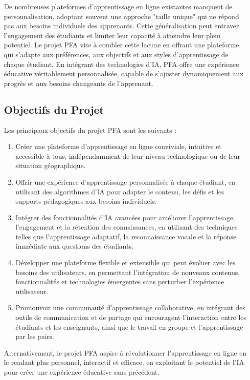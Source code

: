 De nombreuses plateformes d'apprentissage en ligne existantes manquent de personnalisation, adoptant souvent une approche "taille unique" qui ne répond pas aux besoins individuels des apprenants. Cette généralisation peut entraver l'engagement des étudiants et limiter leur capacité à atteindre leur plein potentiel. Le projet \gls{PFA} vise à combler cette lacune en offrant une plateforme qui s'adapte aux préférences, aux objectifs et aux styles d'apprentissage de chaque étudiant. En intégrant des technologies d'\gls{IA}, \gls{PFA} offre une expérience éducative véritablement personnalisée, capable de s'ajuster dynamiquement aux progrès et aux besoins changeants de l'apprenant.
\newline

\subsection*{Objectifs du Projet}

Les principaux objectifs du projet \gls{PFA} sont les suivants :

\begin{enumerate}[label=\Roman*.]

    \item Créer une plateforme d'apprentissage en ligne conviviale, intuitive et accessible à tous, indépendamment de leur niveau technologique ou de leur situation géographique.
    \item Offrir une expérience d'apprentissage personnalisée à chaque étudiant, en utilisant des algorithmes d'\gls{IA} pour adapter le contenu, les défis et les supports pédagogiques aux besoins individuels.
    \item Intégrer des fonctionnalités d'\gls{IA} avancées pour améliorer l'apprentissage, l'engagement et la rétention des connaissances, en utilisant des techniques telles que l'apprentissage adaptatif, la reconnaissance vocale et la réponse immédiate aux questions des étudiants.
    \item Développer une plateforme flexible et extensible qui peut évoluer avec les besoins des utilisateurs, en permettant l'intégration de nouveaux contenus, fonctionnalités et technologies émergentes sans perturber l'expérience utilisateur.
    \item Promouvoir une communauté d'apprentissage collaborative, en intégrant des outils de communication et de partage qui encouragent l'interaction entre les étudiants et les enseignants, ainsi que le travail en groupe et l'apprentissage par les pairs.

\end{enumerate}
Alternativement, le projet \gls{PFA} aspire à révolutionner l'apprentissage en ligne en le rendant plus personnel, interactif et efficace, en exploitant le potentiel de l'\gls{IA} pour créer une expérience éducative sans précédent.


